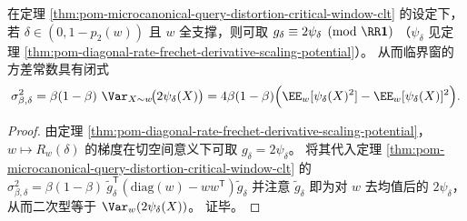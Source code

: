 \begin{corollary}\label{cor:pom-microcanonical-query-distortion-critical-window-variance-psi}
在定理 \ref{thm:pom-microcanonical-query-distortion-critical-window-clt} 的设定下，若 \(\delta\in(0,1-p_2(w))\) 且 \(w\) 全支撑，则可取
\(
g_\delta\equiv 2\psi_\delta\pmod{\RR\mathbf 1}
\)
（\(\psi_\delta\) 见定理 \ref{thm:pom-diagonal-rate-frechet-derivative-scaling-potential}）。
从而临界窗的方差常数具有闭式
\[
\sigma_{\beta,\delta}^2
=\beta(1-\beta)\ \Var_{X\sim w}\!\bigl(2\psi_\delta(X)\bigr)
=4\beta(1-\beta)\Bigl(\EE_w[\psi_\delta(X)^2]-\EE_w[\psi_\delta(X)]^2\Bigr).
\]
\end{corollary}
\begin{proof}
由定理 \ref{thm:pom-diagonal-rate-frechet-derivative-scaling-potential}，\(w\mapsto R_w(\delta)\) 的梯度在切空间意义下可取 \(g_\delta=2\psi_\delta\)。
将其代入定理 \ref{thm:pom-microcanonical-query-distortion-critical-window-clt} 的
\(
\sigma_{\beta,\delta}^2=\beta(1-\beta)\ \widetilde g_\delta^{\mathsf T}(\mathrm{diag}(w)-ww^{\mathsf T})\widetilde g_\delta
\)
并注意 \(\widetilde g_\delta\) 即为对 \(w\) 去均值后的 \(2\psi_\delta\)，从而二次型等于 \(\Var_w(2\psi_\delta(X))\)。
证毕。
\end{proof}




\endinput

